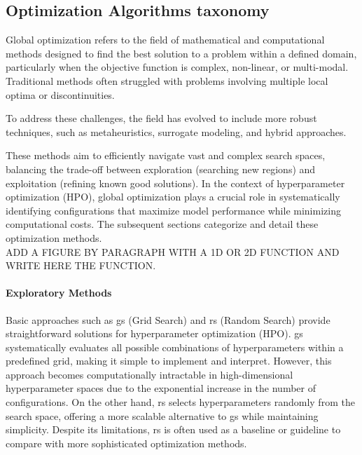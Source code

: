 \subsection{Optimization Algorithms taxonomy}
\label{sec : opt_algo}
\FloatBarrier

Global optimization refers to the field of mathematical and computational methods designed to find the best solution to a problem within a defined domain, particularly when the objective function is complex, non-linear, or multi-modal. Traditional methods often struggled with problems involving multiple local optima or discontinuities. 

To address these challenges, the field has evolved to include more robust techniques, such as metaheuristics, surrogate modeling, and hybrid approaches. 

These methods aim to efficiently navigate vast and complex search spaces, balancing the trade-off between exploration (searching new regions) and exploitation (refining known good solutions). In the context of hyperparameter optimization (HPO), global optimization plays a crucial role in systematically identifying configurations that maximize model performance while minimizing computational costs. The subsequent sections categorize and detail these optimization methods. 
\\ ADD A FIGURE BY PARAGRAPH WITH A 1D OR 2D FUNCTION AND WRITE HERE THE FUNCTION.

\paragraph{Exploratory Methods} 
Basic approaches such as \acrfull{gs} (Grid Search) and \acrfull{rs} (Random Search) provide straightforward solutions for hyperparameter optimization (HPO). \acrshort{gs} systematically evaluates all possible combinations of hyperparameters within a predefined grid, making it simple to implement and interpret. However, this approach becomes computationally intractable in high-dimensional hyperparameter spaces due to the exponential increase in the number of configurations. On the other hand, \acrshort{rs} selects hyperparameters randomly from the search space, offering a more scalable alternative to \acrshort{gs} while maintaining simplicity. Despite its limitations, \acrshort{rs} is often used as a baseline or guideline to compare with more sophisticated optimization methods.

